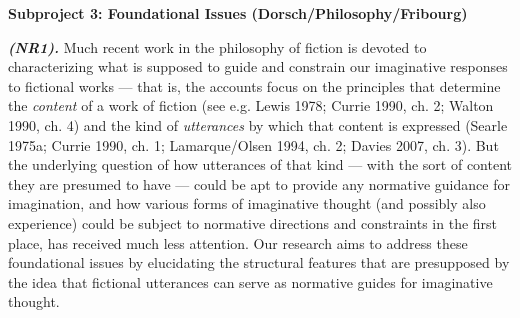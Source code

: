 

\vspace{.4cm}
\noindent\textbf{Subproject 3: Foundational Issues (Dorsch/Philosophy/Fribourg)}
\vspace{.2cm}

\noindent \textbf{\emph{(NR1).}} Much recent work in the philosophy of fiction is devoted to characterizing what is supposed to guide and constrain our imaginative responses to fictional works --- that is, the accounts focus on the principles that determine the \emph{content} of a work of fiction (see e.g. Lewis 1978; Currie 1990, ch. 2; Walton 1990, ch. 4) and the kind of \emph{utterances} by which that content is expressed (Searle 1975a; Currie 1990, ch. 1; Lamarque/Olsen 1994, ch. 2; Davies 2007, ch. 3). But the underlying question of how utterances of that kind --- with the sort of content they are presumed to have --- could be apt to provide any normative guidance for imagination, and how various forms of imaginative thought (and possibly also experience) could be subject to normative directions and constraints in the first place, has received much less attention. Our research aims to address these foundational issues by elucidating the structural features that are presupposed by the idea that fictional utterances can serve as normative guides for imaginative thought.

